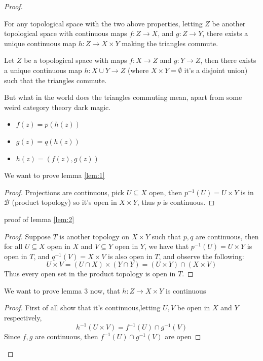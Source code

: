 \documentclass{tufte-handout}
\begin{document}
\begin{proof}
\begin{lemma}
		
	\end{lemma}
	\begin{lemma}\label{lem:3}
		For any topological space with the two above properties, letting $Z$ be another topological space with continuous maps $f \colon Z \to X$, and $g \colon Z \to Y$, there exists a unique continuous map $h \colon Z \to X\times Y$ making the triangles commute.
	\end{lemma}
	\begin{lemma}\label{lem:4}
		Let $Z$ be a topological space with maps $f \colon X \to Z$ and $g \colon Y \to Z$, then there exists a unique continuous map $h \colon X \cup Y \to Z$ (where $X \times Y = \emptyset$ it's a disjoint union) such that the triangles commute.	
	\end{lemma}
	But what in the world does the triangles commuting mean, apart from some weird category theory dark magic. 
	\begin{definition}
		\begin{itemize}
			\item $f(z) = p(h(z))$
			\item $g(z) = q(h(z))$
			\item $h(z) = (f(z), g(z))$

		\end{itemize}
	\end{definition}
	We want to prove lemma \ref{lem:1}
	\begin{proof}
		Projections are continuous, pick $U \subseteq X$ open, then $p^{-1}(U) = U \times Y$ is in $\mathcal{B}$ (product topology) so it's open in $X \times Y$, thus $p$ is continuous.
	\end{proof}
	proof of lemma \ref{lem:2}
	\begin{proof}
		Suppose $T$ is another topology on $X \times Y$ such that $p,q$ are continuous, then for all $U \subseteq X$ open in $X$ and $V \subseteq Y$ open in $Y$, we have that $p^{-1}(U) = U \times Y$ is open in $T$, and $q^{-1}(V) = X \times V$ is also open in $T$, and observe the following:
		$$
			U \times V = (U \cap X) \times (Y \cap Y) = (U\times Y ) \cap (X \times V) 
		$$
		Thus every open set in the product topology is open in $T$. 
	\end{proof}
	We want to prove lemma 3 now, that $h \colon Z \to X\times Y$ is continuous
	\begin{proof}
		First of all show that it's continuous,letting $U,V$ be open in $X$ and $Y$ respectively,
		$$
			h^{-1}(U \times V) = f^{-1}(U) \cap g^{-1}(V)
		$$ 
		Since $f,g$ are continuous, then $f^{-1}(U) \cap g^{-1}(V)$ are open
	\end{proof}
\end{proof}
\end{document}
